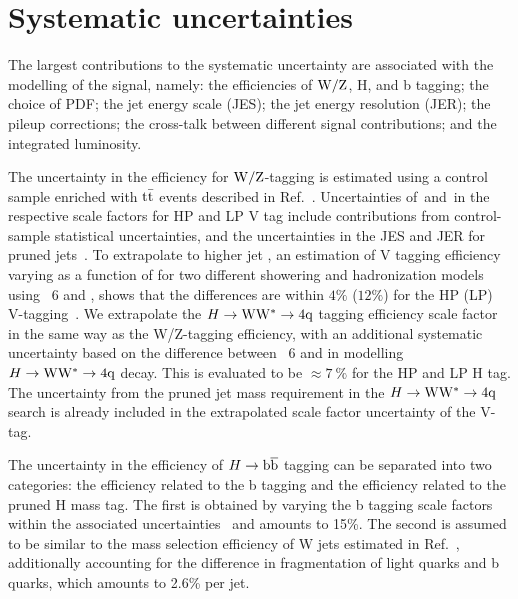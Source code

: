 
\section{Systematic uncertainties}
\label{sec:systematics2}


The largest contributions to 
the systematic uncertainty are 
associated with the modelling of the signal, 
namely: the efficiencies of ${\rm W}/{\rm Z}$, H, and b tagging; 
the choice of PDF; the jet energy 
scale (JES); the jet energy resolution (JER); the 
pileup corrections; the cross-talk between 
different signal contributions; and the integrated luminosity.


The uncertainty in the efficiency for ${\rm W}/{\rm Z}$-tagging 
is estimated using a control sample enriched with ${\rm t\bar{t}}$ 
events
described in Ref.~\cite{JME-13-006}. 
Uncertainties of\scalefactorHPu~and\scalefactorLPu~in
 the respective scale factors for HP and LP V tag
include contributions from control-sample statistical uncertainties,
and the uncertainties in the JES and JER for 
pruned jets~\cite{Khachatryan:2014hpa}.
To extrapolate to
higher jet \pt, %
an estimation of V tagging efficiency varying
as a function of
\pt for two different showering and hadronization models using
\PYTHIA~6 and \HERWIG{++}, 
shows that the differences are within $4\%$ ($12\%$)
for the HP (LP) V-tagging~\cite{JME-13-006}. 
We extrapolate the $H\to{\rm W}{\rm W}^*\to4{\rm q}$ tagging efficiency
scale factor in the same way as the W/Z-tagging efficiency, with 
an additional systematic uncertainty based on the difference between
\PYTHIA~6 and \HERWIG{++} in modelling $H\to{\rm W}{\rm W}^*\to4{\rm q}$ decay. 
This is evaluated to be ${\approx} 7~\%$ 
for the HP and LP H tag. %
The uncertainty from the pruned jet mass requirement in the $H\to{\rm W}{\rm W}^*\to4{\rm q}$ 
search is already included in the extrapolated
scale factor uncertainty of the V-tag. 

The uncertainty in the efficiency of $H\to\mathrm{b\overline{b}}$ tagging can be separated into two categories: the
efficiency related to the b tagging and the efficiency related to the pruned H mass tag. 
The first is
obtained by varying the b tagging scale factors within the associated uncertainties~\cite{BTV-13-001} 
and amounts
to 15\%. The second is assumed 
to be similar to the mass selection efficiency of
W jets estimated in Ref.~\cite{JME-13-006}, additionally accounting
for the difference in fragmentation of light quarks and 
b quarks, which amounts to 2.6\% per jet. 



